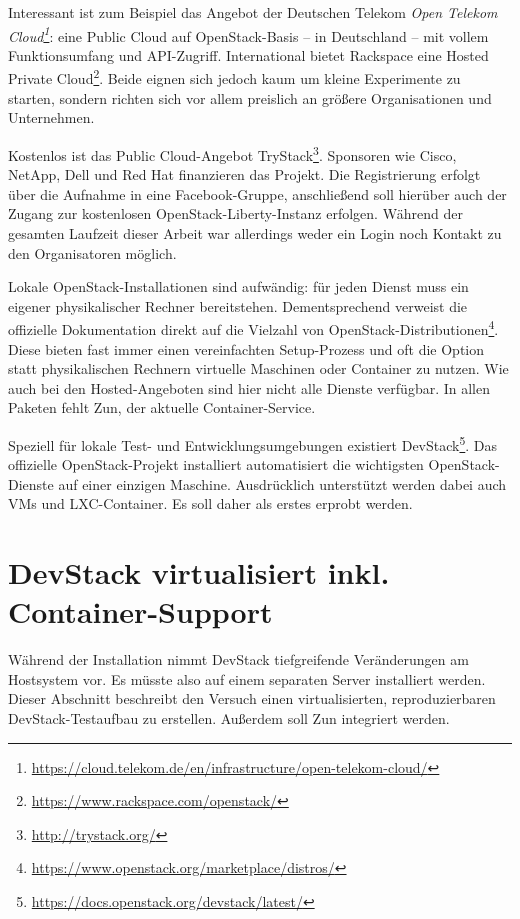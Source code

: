 Interessant ist zum Beispiel das Angebot der Deutschen Telekom \emph{Open Telekom Cloud\footnote{\url{https://cloud.telekom.de/en/infrastructure/open-telekom-cloud/}}}: eine Public Cloud auf OpenStack-Basis -- in Deutschland -- mit vollem Funktionsumfang und API-Zugriff. International bietet Rackspace eine Hosted Private Cloud\footnote{\url{https://www.rackspace.com/openstack/}}. Beide eignen sich jedoch kaum um kleine Experimente zu starten, sondern richten sich vor allem preislich an größere Organisationen und Unternehmen.

Kostenlos ist das Public Cloud-Angebot TryStack\footnote{\url{http://trystack.org/}}. Sponsoren wie Cisco, \mbox{NetApp}, Dell und Red Hat finanzieren das Projekt. Die Registrierung erfolgt über die Aufnahme in eine Facebook-Gruppe, anschließend soll hierüber auch der Zugang zur kostenlosen OpenStack-Liberty-Instanz erfolgen. Während der gesamten Laufzeit dieser Arbeit war allerdings weder ein Login noch Kontakt zu den Organisatoren möglich.

Lokale OpenStack-Installationen sind aufwändig: für jeden Dienst muss ein eigener physikalischer Rechner bereitstehen. Dementsprechend verweist die offizielle Dokumentation direkt auf die Vielzahl von OpenStack-Distributionen\footnote{\url{https://www.openstack.org/marketplace/distros/}}. Diese bieten fast immer einen vereinfachten Setup-Prozess und oft die Option statt physikalischen Rechnern virtuelle Maschinen oder Container zu nutzen. Wie auch bei den Hosted-Angeboten sind hier nicht alle Dienste verfügbar. In allen Paketen fehlt Zun, der aktuelle Container-Service.

Speziell für lokale Test- und Entwicklungsumgebungen existiert DevStack\footnote{\url{https://docs.openstack.org/devstack/latest/}}. Das offizielle OpenStack-Projekt installiert automatisiert die wichtigsten OpenStack-Dienste auf einer einzigen Maschine. Ausdrücklich unterstützt werden dabei auch VMs und LXC-Container. Es soll daher als erstes erprobt werden.


\section{DevStack virtualisiert inkl. Container-Support}


Während der Installation nimmt DevStack tiefgreifende Veränderungen am Hostsystem vor. Es müsste also auf einem separaten Server installiert werden. Dieser Abschnitt beschreibt den Versuch einen virtualisierten, reproduzierbaren DevStack-Testaufbau zu erstellen. Außerdem soll Zun integriert werden. 


